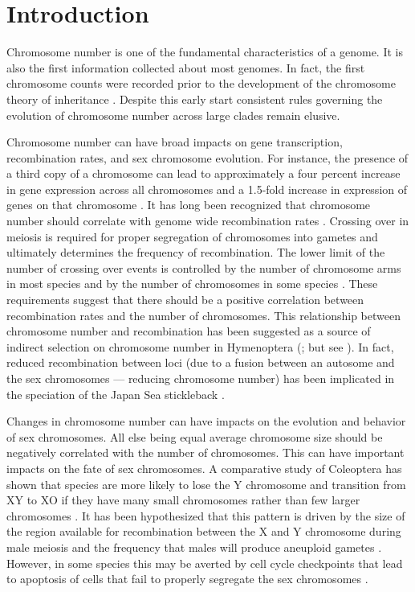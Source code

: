 \section{Introduction}
Chromosome number is one of the fundamental characteristics of a genome.
It is also the first information collected about most genomes. 
In fact, the first chromosome counts were recorded prior to the development of the chromosome theory of inheritance \citep{flemming1882}.
Despite this early start consistent rules governing the evolution of chromosome number across large clades remain elusive. 

Chromosome number can have broad impacts on gene transcription, recombination rates, and sex chromosome evolution. 
For instance, the presence of a third copy of a chromosome can lead to approximately a four percent increase in gene expression across all chromosomes and a 1.5-fold increase in expression of genes on that chromosome \citep{lockstone2007, williams2008aneuploidy}. 
It has long been recognized that chromosome number should correlate with genome wide recombination rates \citep{stebbins1958}.
Crossing over in meiosis is required for proper segregation of chromosomes into gametes and ultimately determines the frequency of recombination.
The lower limit of the number of crossing over events is controlled by the number of chromosome arms in most species and by the number of chromosomes in some species \citep{dumont2017req}.
These requirements suggest that there should be a positive correlation between recombination rates and the number of chromosomes. 
This relationship between chromosome number and recombination has been suggested as a source of indirect selection on chromosome number in Hymenoptera (\citealt{sherman1979}; but see \citealt{ross2015}).
In fact, reduced recombination between loci (due to a fusion between an autosome and the sex chromosomes --- reducing chromosome number) has been implicated in the speciation of the Japan Sea stickleback \citep{kitano2012}. 

Changes in chromosome number can have impacts on the evolution and behavior of sex chromosomes. 
All else being equal average chromosome size should be negatively correlated with the number of chromosomes.
This can have important impacts on the fate of sex chromosomes.
A comparative study of Coleoptera has shown that species are more likely to lose the Y chromosome and transition from XY to XO if they have many small chromosomes rather than few larger chromosomes \citep{blackmon2015bioessay}.
It has been hypothesized that this pattern is driven by the size of the region available for recombination between the X and Y chromosome during male meiosis and the frequency that males will produce aneuploid gametes \citep{blackmon2014}.
However, in some species this may be averted by cell cycle checkpoints that lead to apoptosis of cells that fail to properly segregate the sex chromosomes \citep{dumont2017par}.


